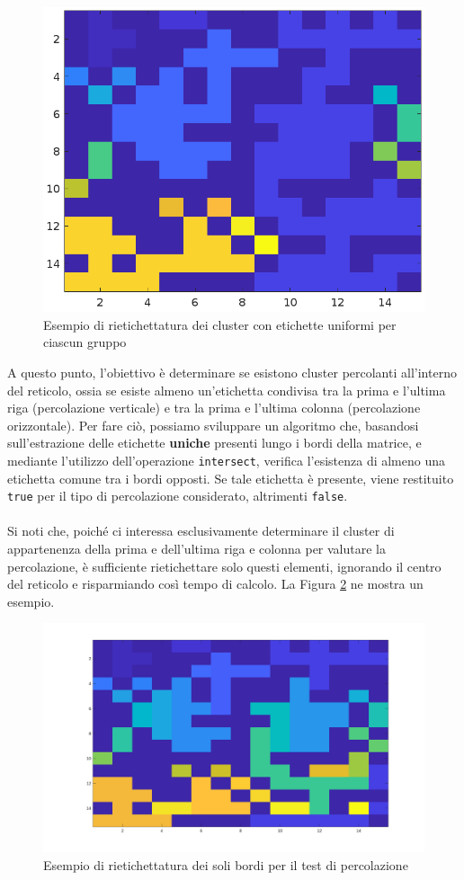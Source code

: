 \begin{figure}[H]
\begin{minipage}{0.45\textwidth}
		\includegraphics[width=\linewidth]{images/re-labelled}
	\end{minipage}
	\label{fig:relabelled}
	\caption{Esempio di rietichettatura dei cluster con etichette uniformi per ciascun gruppo}
\end{figure}
\noindent
A questo punto, l'obiettivo è determinare se esistono cluster percolanti all'interno del reticolo, ossia se esiste almeno un'etichetta condivisa tra la prima e l'ultima riga (percolazione verticale) e tra la prima e l'ultima colonna (percolazione orizzontale). Per fare ciò, possiamo sviluppare un algoritmo che, basandosi sull'estrazione delle etichette \textbf{uniche} presenti lungo i bordi della matrice, e mediante l'utilizzo dell'operazione \texttt{intersect},  verifica l'esistenza di almeno una etichetta comune tra i bordi opposti. Se tale etichetta è presente, viene restituito \texttt{true} per il tipo di percolazione considerato, altrimenti \texttt{false}.
\\\\
\noindent
Si noti che, poiché ci interessa esclusivamente determinare il cluster di appartenenza della prima e dell’ultima riga e colonna per valutare la percolazione, è sufficiente rietichettare solo questi elementi, ignorando il centro del reticolo e risparmiando così tempo di calcolo. La Figura \ref{fig:relabelled-edge} ne mostra un esempio.
\begin{figure}
	\centering
	\includegraphics[width=0.7\linewidth]{images/re-labelled-edge}
	\caption{Esempio di rietichettatura dei soli bordi per il test di percolazione}
	\label{fig:relabelled-edge}
\end{figure}
